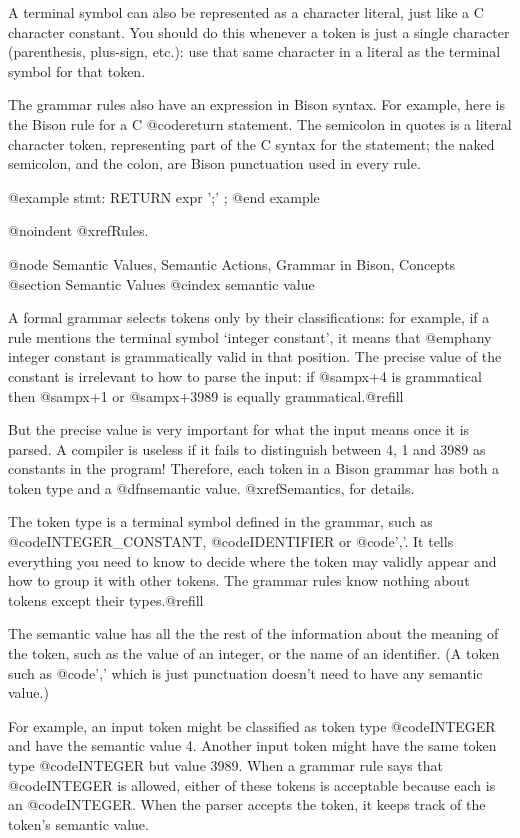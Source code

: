 A terminal symbol can also be represented as a character literal, just like
a C character constant.  You should do this whenever a token is just a
single character (parenthesis, plus-sign, etc.): use that same character in
a literal as the terminal symbol for that token.

The grammar rules also have an expression in Bison syntax.  For example,
here is the Bison rule for a C @code{return} statement.  The semicolon in
quotes is a literal character token, representing part of the C syntax for
the statement; the naked semicolon, and the colon, are Bison punctuation
used in every rule.

@example
stmt:   RETURN expr ';'
        ;
@end example

@noindent
@xref{Rules}.

@node Semantic Values, Semantic Actions, Grammar in Bison, Concepts
@section Semantic Values
@cindex semantic value

A formal grammar selects tokens only by their classifications: for example,
if a rule mentions the terminal symbol `integer constant', it means that
@emph{any} integer constant is grammatically valid in that position.  The
precise value of the constant is irrelevant to how to parse the input: if
@samp{x+4} is grammatical then @samp{x+1} or @samp{x+3989} is equally
grammatical.@refill

But the precise value is very important for what the input means once it is
parsed.  A compiler is useless if it fails to distinguish between 4, 1 and
3989 as constants in the program!  Therefore, each token in a Bison grammar
has both a token type and a @dfn{semantic value}.  @xref{Semantics},
for details.

The token type is a terminal symbol defined in the grammar, such as
@code{INTEGER_CONSTANT}, @code{IDENTIFIER} or @code{','}.  It tells
everything you need to know to decide where the token may validly appear
and how to group it with other tokens.  The grammar rules know nothing
about tokens except their types.@refill

The semantic value has all the the rest of the information about the
meaning of the token, such as the value of an integer, or the name of an
identifier.  (A token such as @code{','} which is just punctuation doesn't
need to have any semantic value.)

For example, an input token might be classified as token type
@code{INTEGER} and have the semantic value 4.  Another input token might
have the same token type @code{INTEGER} but value 3989.  When a grammar
rule says that @code{INTEGER} is allowed, either of these tokens is
acceptable because each is an @code{INTEGER}.  When the parser accepts the
token, it keeps track of the token's semantic value.

